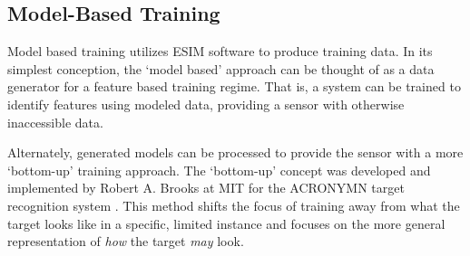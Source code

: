 	\subsection{Model-Based Training}
		Model based training utilizes ESIM software to produce training data. In its simplest conception, the `model based' approach can be thought of as a data generator for a feature based training regime. That is, a system can be trained to identify features using modeled data, providing a sensor with otherwise inaccessible data.

		Alternately, generated models can be processed to provide the sensor with a more `bottom-up' training approach. The `bottom-up' concept was developed and implemented by Robert A. Brooks at MIT for the ACRONYMN target recognition system \cite{Brooks}\cite{Brooks2}. This method shifts the focus of training away from what the target looks like in a specific, limited instance and focuses on the more general representation of \textit{how} the target \textit{may} look.
